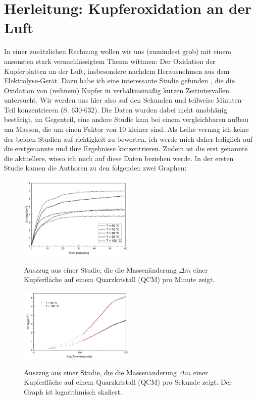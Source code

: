 \section{Herleitung: Kupferoxidation an der Luft}
In einer zusätzlichen Rechnung wollen wir uns (zumindest grob) mit einem ansonsten stark vernachlässigtem Thema wittmen:
Der Oxidation der Kupferplatten an der Luft, insbesondere nachdem Herausnehmen aus dem Elektrolyse-Gerät.
Dazu habe ich eine interessante Studie gefunden \cite{KupferStudie}, die die Oxidation von (reihnem) Kupfer in verhältnismäßig kurzen Zeitintervallen untersucht. 
Wir werden uns hier also auf den Sekunden und teilweise Minuten-Teil konzentrieren (S. 630-632). Die Daten wurden dabei nicht unabhänig bestätigt, im Gegenteil, eine andere Studie \cite{KupferStudie2} kam bei einem vergleichbaren aufbau um Massen, die um einen Faktor von 10 kleiner sind. 
Als Leihe vermag ich keine der beiden Studien auf richtigkeit zu bewerten, ich werde mich daher lediglich auf die erstgenannte und ihre Ergebnisse konzentrieren. Zudem ist die erst genannte die aktuellere, wieso ich mich auf diese Daten beziehen werde. 
In der  ersten Studie \cite{KupferStudie} kamen die Authoren zu den folgenden zwei Graphen:
\begin{figure}[h!]
    \centering
    \includegraphics[width=0.5\textwidth]{img/21/Stud1.png}
    \label{fig:stud_1}
    \caption{Auszzug aus einer Studie, die die Massenänderung $\Delta m$ einer Kupferfläche auf einem Quarzkristall (QCM) pro Minute zeigt.}
\end{figure}
\begin{figure}[h!]
    \centering
    \includegraphics[width=0.5\textwidth]{img/21/Stud2.png}
    \label{fig:stud_2}
    \caption{Auszzug aus einer Studie, die die Massenänderung $\Delta m$ einer Kupferfläche auf einem Quarzkristall (QCM) pro Sekunde zeigt. Der Graph ist logarithmisch skaliert.}
\end{figure}

